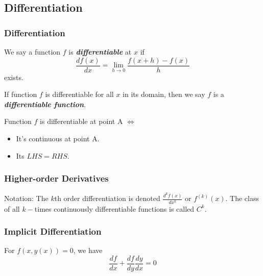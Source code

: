 \subsection{Differentiation}

\subsubsection{Differentiation}

\begin{definition}
    We say a function $f$ is \textit{\textbf{differentiable}} at $x$ if
    \begin{equation*}
        \frac{d f(x)}{dx} = \lim_{h \to 0}\frac{f(x+h)-f(x)}{h}
    \end{equation*}
    exists.
\end{definition}

\begin{definition}
    If function $f$ is differentiable for all $x$ in its domain, then we say $f$ is a \textbf{\textit{differentiable function}}.
\end{definition}

\begin{remark*}
    Function $f$ is differentiable at point A $\iff $
    \begin{itemize}
        \item It's continuous at point A.
        \item Its $LHS = RHS$.
    \end{itemize}
\end{remark*}

\subsubsection{Higher-order Derivatives}

Notation: The $k$th order differentiation is denoted $\frac{d ^{k}f(x)}{dx ^{k}}$ or $f ^{(k)}(x)$. The class of all $k-$times continuously differentiable functions is called $C^k$.

\subsubsection{Implicit Differentiation}

\begin{proposition}
    For $f(x, y(x)) = 0$, we have \begin{equation*}
        \frac{df}{dx} + \frac{df}{dy}\frac{dy}{dx} = 0
    \end{equation*}
\end{proposition}


